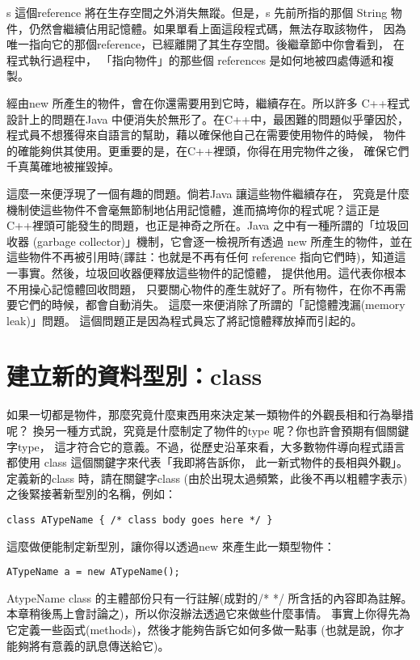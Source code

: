 s 這個reference 將在生存空間之外消失無蹤。但是，s 先前所指的那個
String 物件，仍然會繼續佔用記憶體。如果單看上面這段程式碼，無法存取該物件，
因為唯一指向它的那個reference，已經離開了其生存空間。後繼章節中你會看到，
在程式執行過程中， 「指向物件」的那些個
references 是如何地被四處傳遞和複製。

經由new 所產生的物件，會在你還需要用到它時，繼續存在。所以許多
C++程式設計上的問題在Java 中便消失於無形了。在C++中，最困難的問題似乎肇因於，
程式員不想獲得來自語言的幫助，藉以確保他自己在需要使用物件的時候，
物件的確能夠供其使用。更重要的是，在C++裡頭，你得在用完物件之後，
確保它們千真萬確地被摧毀掉。

這麼一來便浮現了一個有趣的問題。倘若Java 讓這些物件繼續存在，
究竟是什麼機制使這些物件不會毫無節制地佔用記憶體，進而搞垮你的程式呢？這正是
C++裡頭可能發生的問題，也正是神奇之所在。Java 之中有一種所謂的「垃圾回收器
(garbage collector)」機制，它會逐一檢視所有透過
new 所產生的物件，並在這些物件不再被引用時(譯註：也就是不再有任何
reference 指向它們時)，知道這一事實。然後，垃圾回收器便釋放這些物件的記憶體，
提供他用。這代表你根本不用操心記憶體回收問題，
只要關心物件的產生就好了。所有物件，在你不再需要它們的時候，都會自動消失。
這麼一來便消除了所謂的「記憶體洩漏(memory leak)」問題。
這個問題正是因為程式員忘了將記憶體釋放掉而引起的。

\section{建立新的資料型別：class}
如果一切都是物件，那麼究竟什麼東西用來決定某一類物件的外觀長相和行為舉措呢？
換另一種方式說，究竟是什麼制定了物件的type 呢？你也許會預期有個關鍵字type，
這才符合它的意義。不過，從歷史沿革來看，大多數物件導向程式語言都使用
class 這個關鍵字來代表「我即將告訴你，
此一新式物件的長相與外觀」。定義新的class 時，請在關鍵字class
(由於出現太過頻繁，此後不再以粗體字表示)之後緊接著新型別的名稱，例如：

\begin{Verbatim}[frame=single]
class ATypeName { /* class body goes here */ }
\end{Verbatim}

這麼做便能制定新型別，讓你得以透過new 來產生此一類型物件：

\begin{Verbatim}[frame=single]
ATypeName a = new ATypeName();
\end{Verbatim}

AtypeName class 的主體部份只有一行註解(成對的/* */ 所含括的內容即為註解。
本章稍後馬上會討論之)，所以你沒辦法透過它來做些什麼事情。
事實上你得先為它定義一些函式(methods)，然後才能夠告訴它如何多做一點事
(也就是說，你才能夠將有意義的訊息傳送給它)。
